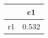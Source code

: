 \begin{table}[htbp]
\begin{tabular}{lc} \hline \hline
 & c1  \\  \hline 
r1 &     0.532 \\  
\hline \hline \end{tabular}
\end{table}
